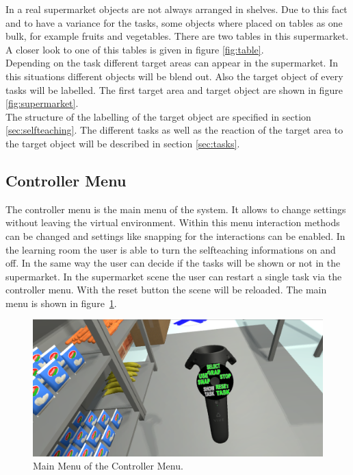 In a real supermarket objects are not always arranged in shelves. Due to this fact and to have a variance for the tasks,  some objects where placed on tables as one bulk, for example fruits and vegetables. There are two tables in this supermarket. A closer look to one of this tables is given in figure \ref{fig:table}.\\
Depending on the task different target areas can appear in the supermarket. In this situations different objects will be blend out. Also the target object of every tasks will be labelled. The first target area and target object are shown in figure \ref{fig:supermarket}.\\
The structure of the labelling of the target object are specified in section \ref{sec:selfteaching}.
The different tasks as well as the reaction of the target area to the target object will be described in section \ref{sec:tasks}.

\subsection{Controller Menu} \label{sec:Menu}
The controller menu is the main menu of the system. It allows to change settings without leaving the virtual environment. Within this menu interaction methods can be changed and settings like snapping for the interactions can be enabled. In the learning room	the user is able to turn the selfteaching informations on and off. In the same way the user can decide if the tasks will be shown or not in the supermarket. In the supermarket scene the user can restart a single task via the controller menu. With the reset button the scene will be reloaded. The main menu is shown in figure~\ref{fig:mainMenu}.

\begin{figure}[H] 
	\center 
	\includegraphics[width=12cm]{Images/Menu1.PNG}
	\caption[Main Menu of the Controller Menu.]{Main Menu of the Controller Menu.}
	\label{fig:mainMenu}
\end{figure}

